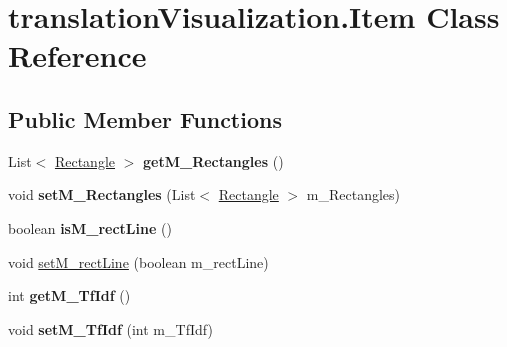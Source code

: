 \hypertarget{classtranslation_visualization_1_1_item}{}\section{translation\+Visualization.\+Item Class Reference}
\label{classtranslation_visualization_1_1_item}
\subsection*{Public Member Functions}
\begin{DoxyCompactItemize}
\item 
\mbox{\label{classtranslation_visualization_1_1_item_a091eb1a32c4bafea21e292305d279994}} 
List$<$ \hyperlink{classtranslation_visualization_1_1_rectangle}{Rectangle} $>$ {\bfseries get\+M\+\_\+\+Rectangles} ()
\item 
\mbox{\label{classtranslation_visualization_1_1_item_afb2d63045d05af237315f5f6ce9bbb92}} 
void {\bfseries set\+M\+\_\+\+Rectangles} (List$<$ \hyperlink{classtranslation_visualization_1_1_rectangle}{Rectangle} $>$ m\+\_\+\+Rectangles)
\item 
\mbox{\label{classtranslation_visualization_1_1_item_ad3286b1a4fdeb176747e2dd270beb984}} 
boolean {\bfseries is\+M\+\_\+rect\+Line} ()
\item 
void \hyperlink{classtranslation_visualization_1_1_item_a69fedd10c24dc426d64a0297d8723db3}{set\+M\+\_\+rect\+Line} (boolean m\+\_\+rect\+Line)
\item 
\mbox{\label{classtranslation_visualization_1_1_item_add40891f8316d3bb38035cf7365d0547}} 
int {\bfseries get\+M\+\_\+\+Tf\+Idf} ()
\item 
\mbox{\label{classtranslation_visualization_1_1_item_adc795c472428e99da2d183f0f3b0bb99}} 
void {\bfseries set\+M\+\_\+\+Tf\+Idf} (int m\+\_\+\+Tf\+Idf)
\item 
\mbox{\label{classtranslation_visualization_1_1_item_aae7bd3ea9fd376b3fa1366c47297ba39}} 

\end{DoxyCompactItemize}
